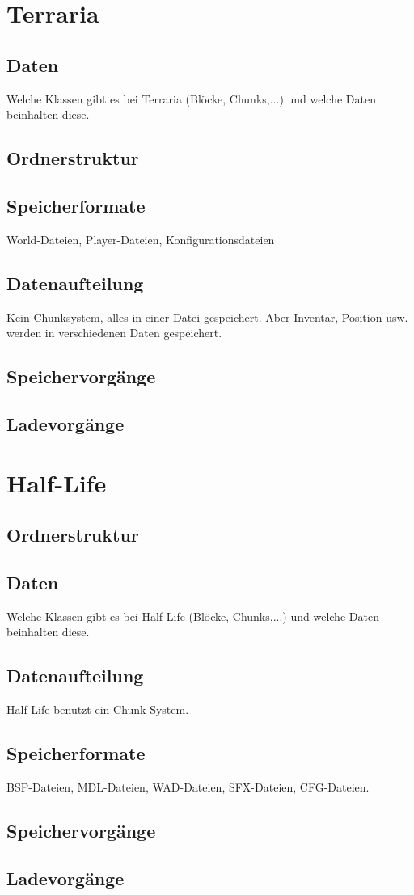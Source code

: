 \section{Terraria}
\subsection{Daten}
Welche Klassen gibt es bei Terraria (Blöcke, Chunks,...) und welche Daten 
beinhalten diese.

\subsection{Ordnerstruktur}

\subsection{Speicherformate}
World-Dateien, Player-Dateien, Konfigurationsdateien 

\subsection{Datenaufteilung}
Kein Chunksystem, alles in einer Datei gespeichert. Aber Inventar, Position
usw. werden in verschiedenen Daten gespeichert.

\subsection{Speichervorgänge}

\subsection{Ladevorgänge}



\section{Half-Life}
\subsection{Ordnerstruktur}
\subsection{Daten}
Welche Klassen gibt es bei Half-Life (Blöcke, Chunks,...) und welche Daten 
beinhalten diese.

\subsection{Datenaufteilung}
Half-Life benutzt ein Chunk System.

\subsection{Speicherformate}
BSP-Dateien, MDL-Dateien, WAD-Dateien, SFX-Dateien, CFG-Dateien.

\subsection{Speichervorgänge}

\subsection{Ladevorgänge}